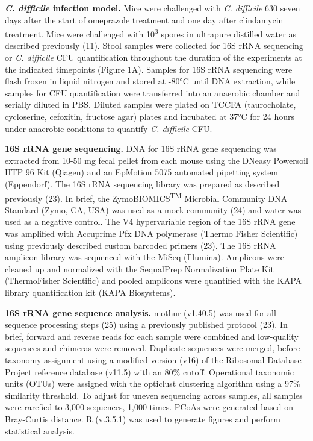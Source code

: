 \documentclass[11pt,]{article}
\begin{document}
\textbf{\emph{C. difficile} infection model.} Mice were challenged with
\emph{C. difficile} 630 seven days after the start of omeprazole
treatment and one day after clindamycin treatment. Mice were challenged
with 10\textsuperscript{3} spores in ultrapure distilled water as
described previously (11). Stool samples were collected for 16S rRNA
sequencing or \emph{C. difficile} CFU quantification throughout the
duration of the experiments at the indicated timepoints (Figure 1A).
Samples for 16S rRNA sequencing were flash frozen in liquid nitrogen and
stored at -80°C until DNA extraction, while samples for CFU
quantification were transferred into an anaerobic chamber and serially
diluted in PBS. Diluted samples were plated on TCCFA (taurocholate,
cycloserine, cefoxitin, fructose agar) plates and incubated at 37°C for
24 hours under anaerobic conditions to quantify \emph{C. difficile} CFU.

\textbf{16S rRNA gene sequencing.} DNA for 16S rRNA gene sequencing was
extracted from 10-50 mg fecal pellet from each mouse using the DNeasy
Powersoil HTP 96 Kit (Qiagen) and an EpMotion 5075 automated pipetting
system (Eppendorf). The 16S rRNA sequencing library was prepared as
described previously (23). In brief, the ZymoBIOMICS\textsuperscript{TM}
Microbial Community DNA Standard (Zymo, CA, USA) was used as a mock
community (24) and water was used as a negative control. The V4
hypervariable region of the 16S rRNA gene was amplified with Accuprime
Pfx DNA polymerase (Thermo Fisher Scientific) using previously described
custom barcoded primers (23). The 16S rRNA amplicon library was
sequenced with the MiSeq (Illumina). Amplicons were cleaned up and
normalized with the SequalPrep Normalization Plate Kit (ThermoFisher
Scientific) and pooled amplicons were quantified with the KAPA library
quantification kit (KAPA Biosystems).

\textbf{16S rRNA gene sequence analysis.} mothur (v1.40.5) was used for
all sequence processing steps (25) using a previously published protocol
(23). In brief, forward and reverse reads for each sample were combined
and low-quality sequences and chimeras were removed. Duplicate sequences
were merged, before taxonomy assignment using a modified version (v16)
of the Ribosomal Database Project reference database (v11.5) with an
80\% cutoff. Operational taxonomic units (OTUs) were assigned with the
opticlust clustering algorithm using a 97\% similarity threshold. To
adjust for uneven sequencing across samples, all samples were rarefied
to 3,000 sequences, 1,000 times. PCoAs were generated based on
Bray-Curtis distance. R (v.3.5.1) was used to generate figures and
perform statistical analysis.
\end{document}
